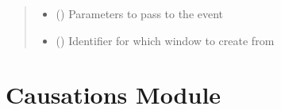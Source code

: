 \documentclass[letterpaper,10pt,english]{sphinxmanual}
\begin{document}
\begin{fulllineitems}
\begin{fulllineitems}
\begin{quote}
\begin{description}
\begin{itemize}
\item {} 
\sphinxAtStartPar
{} () \textendash{} Parameters to pass to the event

\item {} 
\sphinxAtStartPar
{} (\sphinxstyleliteralemphasis{\sphinxupquote{, }}) \textendash{} Identifier for which window to create from

\end{itemize}

\end{description}\end{quote}

\end{fulllineitems}


\end{fulllineitems}



\chapter{Causations  Module}
\label{\detokenize{causations:module-causations}}\label{\detokenize{causations:causations-module}}\label{\detokenize{causations::doc}}
\end{document}
